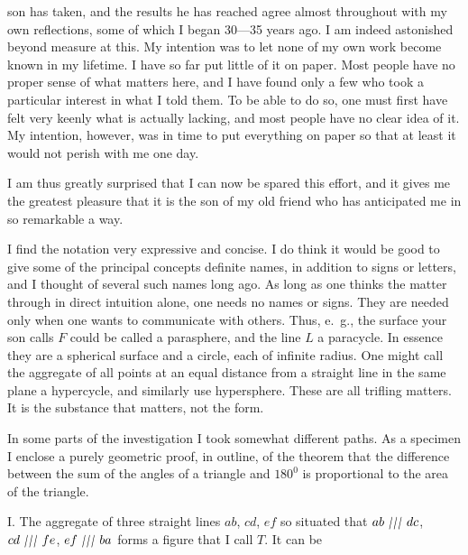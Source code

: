 %
son has taken, and the results he has reached agree almost throughout with my own reflections, some of which I began 30—35 years ago. I am indeed astonished beyond measure at this. My intention was to let none of my own work become known in my lifetime. I have so far put little of it on paper. Most people have no proper sense of what matters here, and I have found only a few who took a particular interest in what I told them. To be able to do so, one must first have felt very keenly what is actually lacking, and most people have no clear idea of it. My intention, however, was in time to put everything on paper so that at least it would not perish with me one day.

I am thus greatly surprised that I can now be spared this effort, and it gives me the greatest pleasure that it is the son of my old friend who has anticipated me in so remarkable a way.

I find the notation very expressive and concise. I do think it would be good to give some of the principal concepts definite names, in addition to signs or letters, and I thought of several such names long ago. As long as one thinks the matter through in direct intuition alone, one needs no names or signs. They are needed only when one wants to communicate with others. Thus, e.~g., the surface your son calls $F$ could be called a parasphere, and the line $L$ a paracycle. In essence they are a spherical surface and a circle, each of infinite radius. One might call the aggregate of all points at an equal distance from a straight line in the same plane a hypercycle, and similarly use hypersphere. These are all trifling matters. It is the substance that matters, not the form.

In some parts of the investigation I took somewhat different paths. As a specimen I enclose a purely geometric proof, in outline, of the theorem that the difference between the sum of the angles of a triangle and $180^{0}$ is proportional to the area of the triangle.

I. The aggregate of three straight lines $ab$, $cd$, $ef$ so situated that $ab\TripleParallel dc$, $cd\TripleParallel fe$, $ef\TripleParallel ba$ forms a figure that I call $T$. It can be
